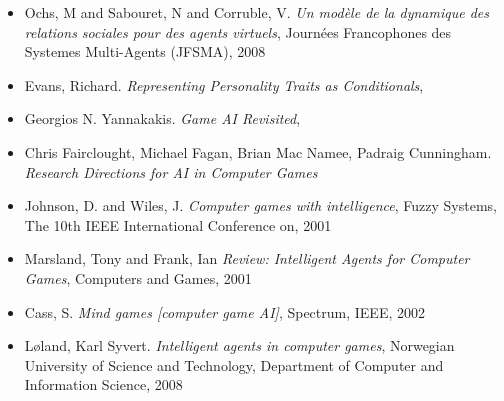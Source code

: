 \documentclass[asi]{picINSAIA}
\begin{document}
\begin{itemize}
\item Ochs, M and Sabouret, N and Corruble, V.
  \textsl{Un mod{\`e}le de la dynamique des relations sociales pour des agents virtuels},
  Journ{\'e}es Francophones des Systemes Multi-Agents (JFSMA),
  2008


\item Evans, Richard.
  \textsl{Representing Personality Traits as Conditionals},

\item Georgios N. Yannakakis.
  \textsl{Game AI Revisited},
  
\item Chris Fairclought, Michael Fagan, Brian Mac Namee, Padraig Cunningham.
  \textsl{Research Directions for AI in Computer Games}

\item Johnson, D. and Wiles, J.
\textsl{Computer games with intelligence},
  Fuzzy Systems, The 10th IEEE International Conference on,
  2001

\item Marsland, Tony and Frank, Ian
\textsl{Review: Intelligent Agents for Computer Games},
Computers and Games,
2001

\item Cass, S.
\textsl{Mind games [computer game AI]},
Spectrum, IEEE,
2002

\item L{\o}land, Karl Syvert.
\textsl{Intelligent agents in computer games},
Norwegian University of Science and Technology, Department of Computer and Information Science,
2008


 
\end{itemize}
\end{document}
